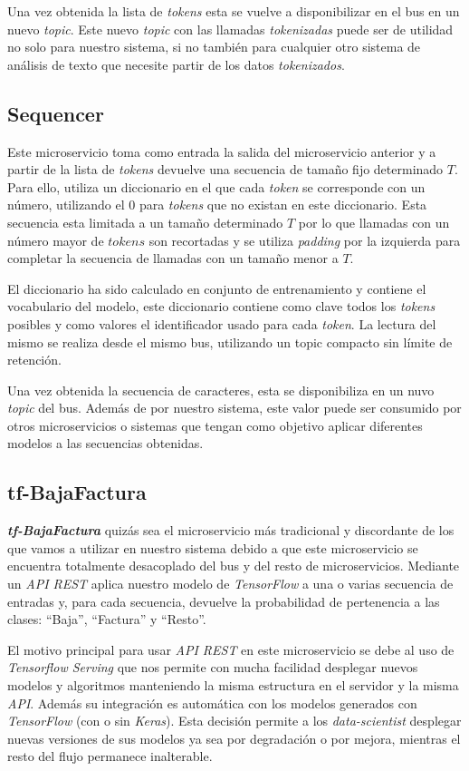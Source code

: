 Una vez obtenida la lista de \textit{tokens} esta se vuelve a disponibilizar en el bus en un nuevo \textit{topic}. Este nuevo \textit{topic} con las llamadas \textit{tokenizadas} puede ser de utilidad no solo para nuestro sistema, si no también para cualquier otro sistema de análisis de texto que necesite partir de los datos \textit{tokenizados}.

\subsection{Sequencer}
Este microservicio toma como entrada la salida del microservicio anterior y a partir de la lista de \textit{tokens} devuelve una secuencia de tamaño fijo determinado $T$. Para ello, utiliza un diccionario en el que cada \textit{token} se corresponde con un número, utilizando el $0$ para \textit{tokens} que no existan en este diccionario. Esta secuencia esta limitada a un tamaño determinado $T$ por lo que llamadas con un número mayor de $tokens$ son recortadas y se utiliza \textit{padding} por la izquierda para completar la secuencia de llamadas con un tamaño menor a $T$.

El diccionario ha sido calculado en conjunto de entrenamiento y contiene el vocabulario del modelo, este diccionario contiene como clave todos los \textit{tokens} posibles y como valores el identificador usado para cada \textit{token}. La lectura del mismo se realiza desde el mismo bus, utilizando un topic compacto sin límite de retención.

Una vez obtenida la secuencia de caracteres, esta se disponibiliza en un nuvo \textit{topic} del bus. Además de por nuestro sistema, este valor puede ser consumido por otros microservicios o sistemas que tengan como objetivo aplicar diferentes modelos a las secuencias obtenidas.


\subsection{tf-BajaFactura}
\textit{\textbf{tf-BajaFactura}} quizás sea el microservicio más tradicional y discordante de los que vamos a utilizar en nuestro sistema debido a que este microservicio se encuentra totalmente desacoplado del bus y del resto de microservicios. Mediante un \textit{API REST} aplica nuestro modelo de \textit{TensorFlow} a una o varias secuencia de entradas y, para cada secuencia, devuelve la probabilidad de pertenencia a las clases: ``Baja'', ``Factura'' y ``Resto''.

El motivo principal para usar \textit{API REST} en este microservicio se debe al uso de \textit{Tensorflow Serving} que nos permite con mucha facilidad desplegar nuevos modelos y algoritmos manteniendo la misma estructura en el servidor y la misma \textit{API}. Además su integración es automática con los modelos generados con \textit{TensorFlow} (con o sin \textit{Keras}). Esta decisión permite a los \textit{data-scientist} desplegar nuevas versiones de sus modelos ya sea por degradación o por mejora, mientras el resto del flujo permanece inalterable. 



